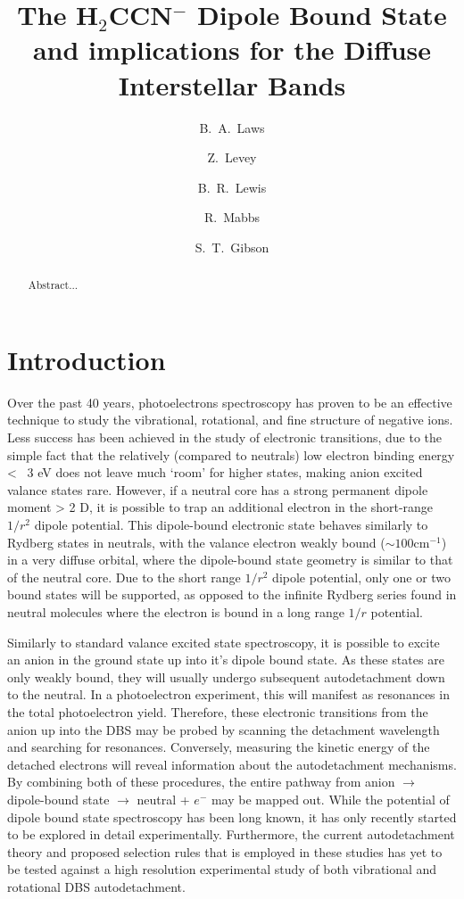 \documentclass[journal=jpcafh,manuscript=article,layout=onecolumn, 12pt]{achemso}
\author{B.~A.~Laws}
\author{Z.~Levey}
\author{B.~R.~Lewis}
\author{R.~Mabbs}
\author{S.~T.~Gibson}
\affiliation{Research School of Physics and Engineering, The Australian
	National University, Canberra ACT 2601, Australia}
\title{The H$_2$CCN$^-$ Dipole Bound State and implications for the Diffuse Interstellar Bands}
\begin{document}
 
\begin{abstract} 
	Abstract...
\end{abstract}
\section{Introduction}
Over the past 40 years, photoelectrons spectroscopy has proven to be an effective technique to study the vibrational, rotational, and fine structure of negative ions. Less success has been achieved in the study of electronic transitions, due to the simple fact that the relatively (compared to neutrals) low electron binding energy <~ 3 eV does not leave much `room' for higher states, making anion excited valance states rare. However, if a neutral core has a strong permanent dipole moment > 2 D, it is possible to trap an additional electron in the short-range $1/r^2$ dipole potential. This dipole-bound electronic state behaves similarly to Rydberg states in neutrals, with the valance electron weakly bound ($\sim 100$cm$^{-1}$) in a very diffuse orbital, where the dipole-bound state geometry is similar to that of the neutral core. Due to the short range $1/r^2$ dipole potential, only one or two bound states will be supported, as opposed to the infinite Rydberg series found in neutral molecules where the electron is bound in a long range $1/r$ potential.

Similarly to standard valance excited state spectroscopy, it is possible to excite an anion in the ground state up into it's dipole bound state. As these states are only weakly bound, they will usually undergo subsequent autodetachment down to the neutral. In a photoelectron experiment, this will manifest as resonances in the total photoelectron yield. Therefore, these electronic transitions from the anion up into the DBS may be probed by scanning the detachment wavelength and searching for resonances. Conversely, measuring the kinetic energy of the detached electrons will reveal information about the autodetachment mechanisms. By combining both of these procedures, the entire pathway from anion $\rightarrow$ dipole-bound state $\rightarrow$ neutral + $e^-$ may be mapped out. While the potential of dipole bound state spectroscopy has been long known, it has only recently started to be explored in detail experimentally. Furthermore, the current autodetachment theory and proposed selection rules that is employed in these studies has yet to be tested against a high resolution experimental study of both vibrational and rotational DBS autodetachment. 
\end{document}
